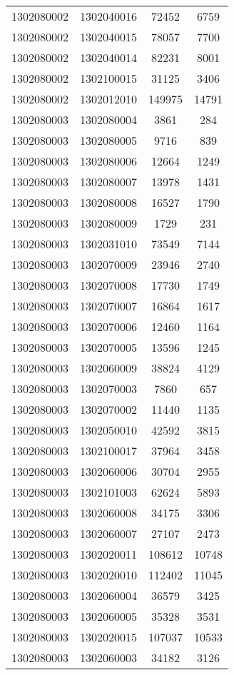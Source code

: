 \begin{longtable}[h]{llcc}
		1302080002 & 1302040016 & 72452 & 6759\\
		1302080002 & 1302040015 & 78057 & 7700\\
		1302080002 & 1302040014 & 82231 & 8001\\
		1302080002 & 1302100015 & 31125 & 3406\\
		1302080002 & 1302012010 & 149975 & 14791\\
		1302080003 & 1302080004 & 3861 & 284\\
		1302080003 & 1302080005 & 9716 & 839\\
		1302080003 & 1302080006 & 12664 & 1249\\
		1302080003 & 1302080007 & 13978 & 1431\\
		1302080003 & 1302080008 & 16527 & 1790\\
		1302080003 & 1302080009 & 1729 & 231\\
		1302080003 & 1302031010 & 73549 & 7144\\
		1302080003 & 1302070009 & 23946 & 2740\\
		1302080003 & 1302070008 & 17730 & 1749\\
		1302080003 & 1302070007 & 16864 & 1617\\
		1302080003 & 1302070006 & 12460 & 1164\\
		1302080003 & 1302070005 & 13596 & 1245\\
		1302080003 & 1302060009 & 38824 & 4129\\
		1302080003 & 1302070003 & 7860 & 657\\
		1302080003 & 1302070002 & 11440 & 1135\\
		1302080003 & 1302050010 & 42592 & 3815\\
		1302080003 & 1302100017 & 37964 & 3458\\
		1302080003 & 1302060006 & 30704 & 2955\\
		1302080003 & 1302101003 & 62624 & 5893\\
		1302080003 & 1302060008 & 34175 & 3306\\
		1302080003 & 1302060007 & 27107 & 2473\\
		1302080003 & 1302020011 & 108612 & 10748\\
		1302080003 & 1302020010 & 112402 & 11045\\
		1302080003 & 1302060004 & 36579 & 3425\\
		1302080003 & 1302060005 & 35328 & 3531\\
		1302080003 & 1302020015 & 107037 & 10533\\
		1302080003 & 1302060003 & 34182 & 3126\\

\end{longtable}
